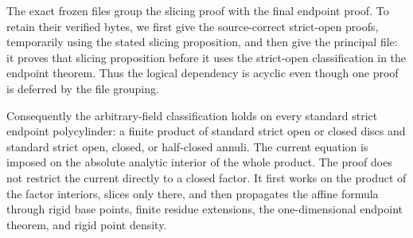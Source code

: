 The exact frozen files group the slicing proof with the final endpoint
proof.  To retain their verified bytes, we first give the source-correct
strict-open proofs, temporarily using the stated slicing proposition, and
then give the principal file: it proves that slicing proposition before it
uses the strict-open classification in the endpoint theorem.  Thus the
logical dependency is acyclic even though one proof is deferred by the
file grouping.

\begingroup
\providecommand{\an}{\mathrm{an}}
\makeatletter
\let\pzerosixtwoproduct@original@nonumberplain\th@nonumberplain
\def\th@nonumberplain{%
  \pzerosixtwoproduct@original@nonumberplain
  \def\@opargbegintheorem##1##2##3{%
    \item[\theorem@headerfont\hskip\labelsep ##3\theorem@separator]}}
\makeatother


\endgroup

Consequently the arbitrary-field classification holds on every standard
strict endpoint polycylinder: a finite product of standard strict open or
closed discs and standard strict open, closed, or half-closed annuli.  The
current equation is imposed on the absolute analytic interior of the whole
product.  The proof does not restrict the current directly to a closed
factor.  It first works on the product of the factor interiors, slices only
there, and then propagates the affine formula through rigid base points,
finite residue extensions, the one-dimensional endpoint theorem, and rigid
point density.

